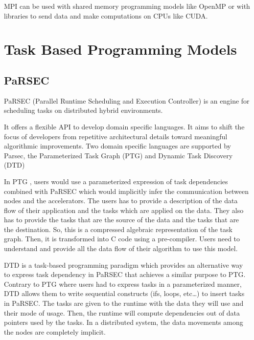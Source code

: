 MPI can be used with shared memory programming models like OpenMP or with libraries to send data and make computations on CPUs like CUDA.


\section{Task Based Programming Models}
\subsection{PaRSEC}
PaRSEC \cite{BBDHL2011} \cite{BBDFH2013} (Parallel Runtime Scheduling and Execution Controller) is an engine for scheduling tasks on distributed hybrid environments.

It offers a flexible API to develop domain specific languages.
It aims to shift the focus of developers from repetitive architectural details toward meaningful algorithmic improvements.
Two domain specific languages are supported by Parsec, the Parameterized Task Graph \cite{DBBHD2014} (PTG) and Dynamic Task Discovery \cite{HoHBD2017} (DTD)

In PTG \cite{DBBHD2014}, users would use a parameterized expression of task dependencies combined with PaRSEC which would implicitly infer the communication between nodes and the accelerators.
The users has to provide a description of the data flow of their application and the tasks which are applied on the data.
They also has to provide the tasks that are the source of the data and the tasks that are the destination.
So, this is a compressed algebraic representation of the task graph.
Then, it is transformed into C code using a pre-compiler.
Users need to understand and provide all the data flow of their algorithm to use this model.


DTD \cite{HoHBD2017} is a task-based programming paradigm which provides an alternative way to express task dependency in PaRSEC that achieves a similar purpose to PTG.
Contrary to PTG where users had to express tasks in a parameterized manner, DTD allows them to write sequential constructs (ifs, loops, etc\dots) to insert tasks in PaRSEC.
The tasks are given to the runtime with the data they will use and their mode of usage.
Then, the runtime will compute dependencies out of data pointers used by the tasks.
In a distributed system, the data movements among the nodes are completely implicit.





